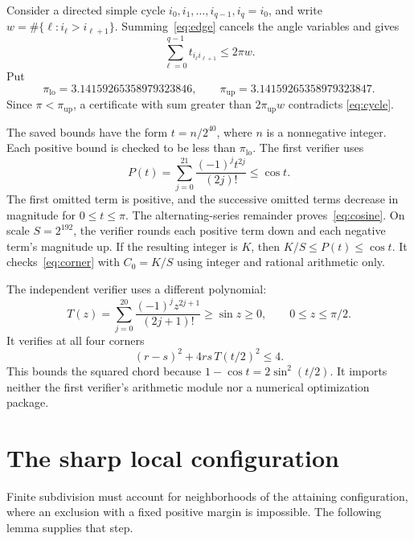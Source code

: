 \documentclass[11pt]{amsart}
\theoremstyle{definition}
\theoremstyle{remark}
\numberwithin{equation}{section}
\newcommand{\pil}{\pi_{\mathrm{lo}}}
\newcommand{\piu}{\pi_{\mathrm{up}}}
\begin{document}
Consider a directed simple cycle $i_0,i_1,\ldots,i_{q-1},i_q=i_0$, and
write $w=\#\{\ell:i_\ell>i_{\ell+1}\}$. Summing~\eqref{eq:edge} cancels
the angle variables and gives
\begin{equation}\label{eq:cycle}
 \sum_{\ell=0}^{q-1}t_{i_\ell i_{\ell+1}}\leq2\pi w.
\end{equation}
Put
\begin{equation}\label{eq:piinterval}
 \pil=3.14159265358979323846,\qquad
 \piu=3.14159265358979323847.
\end{equation}
Since $\pi<\piu$, a certificate with sum greater than $2\piu w$ contradicts
\eqref{eq:cycle}.

The saved bounds have the form $t=n/2^{40}$, where $n$ is a nonnegative
integer. Each positive bound is checked to be less than $\pil$. The first
verifier uses
\begin{equation}\label{eq:cosine}
 P(t)=\sum_{j=0}^{21}\frac{(-1)^j t^{2j}}{(2j)!}\leq\cos t.
\end{equation}
The first omitted term is positive, and the successive omitted terms
decrease in magnitude for $0\leq t\leq\pi$. The alternating-series
remainder proves~\eqref{eq:cosine}. On scale $S=2^{192}$, the verifier
rounds each positive term down and each negative term's magnitude up.
If the resulting integer is $K$, then $K/S\leq P(t)\leq\cos t$.
It checks~\eqref{eq:corner} with $C_0=K/S$ using integer and rational
arithmetic only.

The independent verifier uses a different polynomial:
\begin{equation}\label{eq:sine}
 T(z)=\sum_{j=0}^{20}\frac{(-1)^j z^{2j+1}}{(2j+1)!}
       \geq\sin z\geq0,\qquad 0\leq z\leq\pi/2.
\end{equation}
It verifies at all four corners
\[
 (r-s)^2+4rs\,T(t/2)^2\leq4.
\]
This bounds the squared chord because
$1-\cos t=2\sin^2(t/2)$. It imports neither the first verifier's arithmetic
module nor a numerical optimization package.

\section{The sharp local configuration}\label{sec:local}

Finite subdivision must account for neighborhoods of the attaining
configuration, where an exclusion with a fixed positive margin is
impossible. The following lemma supplies that step.
\end{document}
